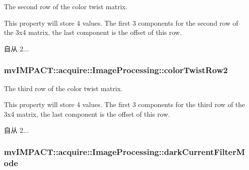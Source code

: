 The second row of the color twist matrix. 

This property will store 4 values. The first 3 components for the second row of the 3x4 matrix, the last component is the offset of this row.

\begin{DoxySince}{自从}
2... 
\end{DoxySince}
\hypertarget{classmv_i_m_p_a_c_t_1_1acquire_1_1_image_processing_a05e9180a634ee3c5da6e41e51a3db47f}{
\subsubsection[{color\+Twist\+Row2}]{ mv\+I\+M\+P\+A\+C\+T\+::acquire\+::\+Image\+Processing\+::color\+Twist\+Row2}}\label{classmv_i_m_p_a_c_t_1_1acquire_1_1_image_processing_a05e9180a634ee3c5da6e41e51a3db47f}


The third row of the color twist matrix. 

This property will store 4 values. The first 3 components for the third row of the 3x4 matrix, the last component is the offset of this row.

\begin{DoxySince}{自从}
2... 
\end{DoxySince}
\hypertarget{classmv_i_m_p_a_c_t_1_1acquire_1_1_image_processing_a86a24af86e5db2dd3efc249ef1db69eb}{
\subsubsection[{dark\+Current\+Filter\+Mode}]{ mv\+I\+M\+P\+A\+C\+T\+::acquire\+::\+Image\+Processing\+::dark\+Current\+Filter\+Mode}}\label{classmv_i_m_p_a_c_t_1_1acquire_1_1_image_processing_a86a24af86e5db2dd3efc249ef1db69eb}


